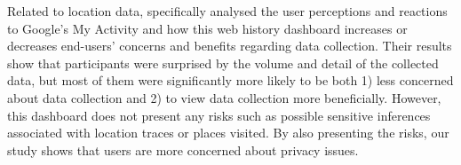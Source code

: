 Related to location data, 
\cite{274582} specifically analysed the user perceptions and reactions to Google's My Activity and how this web history dashboard increases or decreases end-users' concerns and benefits regarding data collection. Their results show that participants were surprised by the volume and detail of the collected data, but most of them were significantly more likely to be both 1) less concerned about data collection and 2) to view data collection more beneficially. However, this dashboard does not present any risks such as possible sensitive inferences associated with location traces or places visited. By also presenting the risks, our study shows that users are more concerned about privacy issues.





